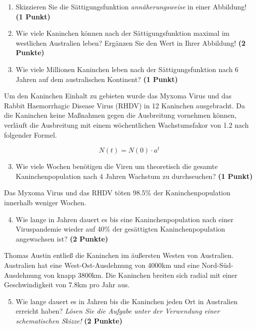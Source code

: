 \documentclass[a4paper, 9pt]{scrartcl}\usepackage[]{graphicx}\usepackage[]{xcolor}
\begin{document}
\begin{enumerate}
\item Skizzieren Sie die Sättigungsfunktion \textit{annäherungsweise} in einer Abbildung! \textbf{(1 Punkt)}
\item Wie viele Kaninchen können nach der Sättigungsfunktion maximal im westlichen Australien leben? Ergänzen Sie den Wert in Ihrer Abbildung! \textbf{(2 Punkte)}
\item Wie viele Millionen Kaninchen leben nach der Sättigungsfunktion nach 6 Jahren auf dem australischen Kontinent? \textbf{(1 Punkt)}
\end{enumerate}

Um den Kaninchen Einhalt zu gebieten wurde das Myxoma Virus und das Rabbit Haemorrhagic Disease Virus (RHDV) in 12 Kaninchen ausgebracht. Da die Kaninchen keine Maßnahmen gegen die Ausbreitung vornehmen können, verläuft die Ausbreitung mit einem wöchentlichen Wachstumsfakor von 1.2 nach folgender Formel.

\begin{equation*}
  N(t) = N(0) \cdot a^t
\end{equation*}

\begin{enumerate}
  \setcounter{enumi}{2}
\item Wie viele Wochen benötigen die Viren um theoretisch die gesamte Kaninchenpopulation nach 4 Jahren Wachstum zu durchseuchen? \textbf{(1 Punkt)}
\end{enumerate}

Das Myxoma Virus und das RHDV töten 98.5\% der Kaninchenpopulation innerhalb weniger Wochen.

\begin{enumerate}
  \setcounter{enumi}{3}  
\item Wie lange in Jahren dauert es bis eine Kaninchenpopulation nach einer Viruspandemie wieder auf 40\% der gesättigten Kaninchenpopulation angewachsen ist?  \textbf{(2 Punkte)}
\end{enumerate}

Thomas Austin entließ die Kaninchen im äußersten Westen von Australien. Australien hat eine West-Ost-Ausdehnung von 4000km und eine Nord-Süd-Ausdehnung von knapp 3800km. Die Kaninchen breiten sich radial mit einer Geschwindigkeit von 7.8km pro Jahr aus.

\begin{enumerate}
  \setcounter{enumi}{4}
\item Wie lange dauert es in Jahren bis die Kaninchen jeden Ort in Australien erreicht haben? \textit{Lösen Sie die Aufgabe unter der Verwendung einer schematischen Skizze!} \textbf{(2 Punkte)}
\end{enumerate}
\end{document}

